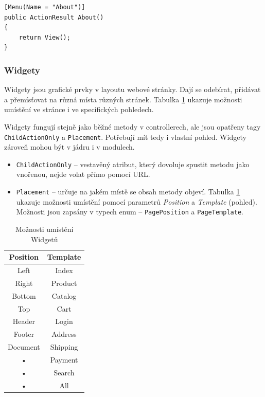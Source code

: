 \documentclass[11pt,twoside,a4paper]{book}
\begin{document}
\begin{lstlisting}[float=h!,language=CSharp, caption={atribut \texttt{Menu}}, label=list:menu]
[Menu(Name = "About")]
public ActionResult About()
{
    return View();
}
\end{lstlisting}


\subsubsection{Widgety}
\label{sec:widgets}

Widgety jsou grafické prvky v layoutu webové stránky. Dají se odebírat, přidávat a přemísťovat na různá místa různých stránek. Tabulka \ref{tab:pozice} ukazuje možnosti umístění ve stránce i ve specifických pohledech. 

Widgety fungují stejně jako běžné metody v controllerech, ale jsou opatřeny tagy \texttt{Child\-Action\-Only} a \texttt{Placement}. Potřebují mít tedy i vlastní pohled. Widgety zároveň mohou být v jádru i v modulech.

\begin{itemize}
\item \texttt{ChildActionOnly} -- vestavěný atribut, který dovoluje spustit metodu jako vnořenou, nejde volat přímo pomocí URL.
\item \texttt{Placement} -- určuje na jakém místě se obsah metody objeví. Tabulka \ref{tab:pozice} ukazuje možnosti umístění pomocí parametrů \textit{Position} a \textit{Template} (pohled). Možnosti jsou zapsány v typech enum -- \texttt{PagePosition} a \texttt{PageTemplate}.
\end{itemize}

\begin{table}
\centering
\begin{tabular}[c]{|c|c|}
\hline 
\textbf{Position} & \textbf{Template} \\ 
\hline 
Left & Index \\ 
\hline 
Right & Product \\ 
\hline 
Bottom & Catalog \\ 
\hline 
Top & Cart \\ 
\hline 
Header & Login \\ 
\hline 
Footer & Address \\ 
\hline 
Document & Shipping \\ 
\hline 
• & Payment \\ 
\hline 
• & Search \\ 
\hline 
• & All \\ 
\hline 
\end{tabular}
\caption{Možnosti umístění Widgetů}
\label{tab:pozice}
\end{table} 
\end{document}
